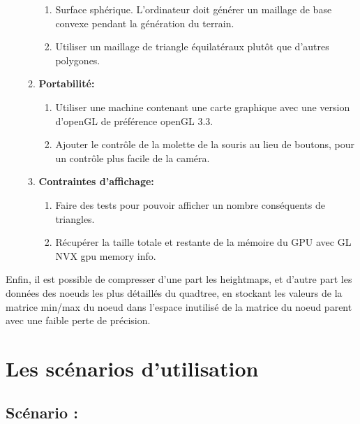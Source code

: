 \documentclass[12pt]{report}
\begin{document}
\begin{enumerate}
\begin{enumerate}
            \begin{enumerate}
                \item Surface sphérique. L'ordinateur doit générer un maillage de base convexe pendant la génération du terrain.
                \item Utiliser un maillage de triangle équilatéraux plutôt que d'autres polygones.
            \end{enumerate}
        \item \textbf{Portabilité:}
        \begin{enumerate}
            \item Utiliser une machine contenant une carte graphique avec une version d'openGL de préférence openGL 3.3.
            \item Ajouter le contrôle de la molette de la souris au lieu de boutons, pour un contrôle plus facile de la caméra.
        \end{enumerate}
        \item \textbf{Contraintes d'affichage:}
        \begin{enumerate}
            \item Faire des tests pour pouvoir afficher un nombre conséquents de triangles.
            \item Récupérer la taille totale et restante de la mémoire du GPU avec GL NVX gpu memory info.
        \end{enumerate}
    \end{enumerate}
\end{enumerate}

Enfin, il est possible de compresser d'une part les heightmaps, et d'autre part les données des noeuds les plus détaillés du quadtree, en stockant les valeurs de la matrice min/max du noeud dans l'espace inutilisé de la matrice du noeud parent avec une faible perte de précision.

\chapter{Les scénarios d'utilisation}
\section{Scénario :}
\end{document}
